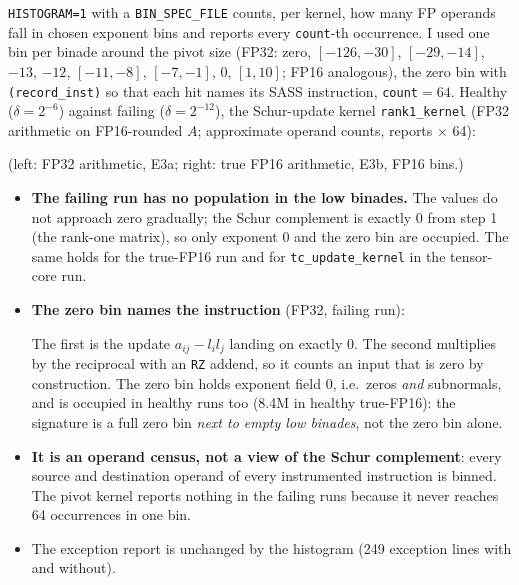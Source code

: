 \documentclass[11pt,a4paper]{article}
\begin{document}
\texttt{HISTOGRAM=1} with a \texttt{BIN\_SPEC\_FILE} counts, per kernel, how many FP operands fall in chosen exponent bins and reports every \texttt{count}-th occurrence.
I used one bin per binade around the pivot size (FP32: zero, $[-126,-30]$, $[-29,-14]$, $-13$, $-12$, $[-11,-8]$, $[-7,-1]$, 0, $[1,10]$; FP16 analogous), the zero bin with \texttt{(record\_inst)} so that each hit names its SASS instruction, \texttt{count}$=64$.
Healthy ($\delta=2^{-6}$) against failing ($\delta=2^{-12}$), the Schur-update kernel \texttt{rank1\_kernel} (FP32 arithmetic on FP16-rounded $A$; approximate operand counts, reports $\times$ 64):

\begin{center}\scriptsize\quad\end{center}

(left: FP32 arithmetic, E3a; right: true FP16 arithmetic, E3b, FP16 bins.)

\begin{itemize}
  \item \textbf{The failing run has no population in the low binades.} The values do not approach zero gradually; the Schur complement is exactly $0$ from step 1 (the rank-one matrix), so only exponent 0 and the zero bin are occupied. The same holds for the true-FP16 run and for \texttt{tc\_update\_kernel} in the tensor-core run.
  \item \textbf{The zero bin names the instruction} (FP32, failing run):
\begin{center}\scriptsize\end{center}
  The first is the update $a_{ij}-l_il_j$ landing on exactly 0. The second multiplies by the reciprocal with an \texttt{RZ} addend, so it counts an input that is zero by construction. The zero bin holds exponent field 0, i.e.\ zeros \emph{and} subnormals, and is occupied in healthy runs too (8.4M in healthy true-FP16): the signature is a full zero bin \emph{next to empty low binades}, not the zero bin alone.
  \item \textbf{It is an operand census, not a view of the Schur complement}: every source and destination operand of every instrumented instruction is binned. The pivot kernel reports nothing in the failing runs because it never reaches 64 occurrences in one bin.
  \item The exception report is unchanged by the histogram (249 exception lines with and without).
\end{itemize}
\end{document}
